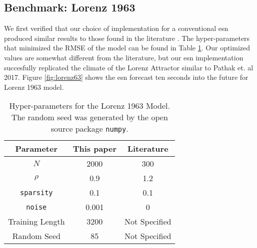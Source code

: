 \subsection{Benchmark: Lorenz 1963}

We first verified that our choice of implementation for a conventional \gls{esn}
produced similar results to those found in the literature
\cite{pathak_using_2017}. The hyper-parameters that minimized the RMSE of the
model can be found in Table \ref{tab:lorenzparam}. Our optimized values are 
somewhat different from the literature, but our \gls{esn} implementation
succesfully replicated the climate of the Lorenz Attractor similar to Pathak
et. al 2017. Figure \ref{fig:lorenz63} shows the \gls{esn} forecast ten seconds
into the future for Lorenz 1963 model.


\begin{table}[h]
  \centering
  \caption{Hyper-parameters for the Lorenz 1963 Model. The random seed was generated by the open source package \texttt{numpy}.}
  \label{tab:lorenzparam}
  \begin{tabular}{c|c|c}
    \hline
    Parameter & This paper & Literature \cite{pathak_using_2017}\\
    \hline
    $N$ & 2000& 300\\
    $\rho$& 0.9&1.2\\
    \texttt{sparsity}& 0.1& 0.1\\
    \texttt{noise}& 0.001& 0\\
    Training Length & 3200& Not Specified\\
    Random Seed & 85 & Not Specified\\
  \end{tabular}
\end{table}
\begin{figure*}[h]
  
  \caption{Using an \gls{esn} to replicate the climate of the Lorenz Attractor.}
  \label{fig:lorenz63}
\end{figure*}
